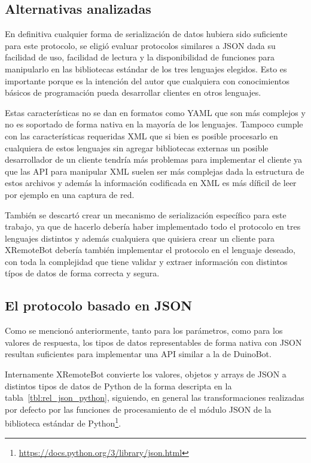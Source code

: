 \subsection{Alternativas analizadas}
En definitiva cualquier forma de serialización de datos hubiera
sido suficiente para este protocolo, se eligió evaluar protocolos
similares a JSON dada su facilidad de uso, facilidad de lectura
y la disponibilidad
de funciones para manipularlo en las bibliotecas estándar
de los tres lenguajes elegidos. Esto es importante porque es
la intención del autor que cualquiera con conocimientos básicos
de programación pueda desarrollar clientes en otros lenguajes.

Estas características no se dan en formatos como YAML que
son más complejos y no es soportado de forma nativa en
la mayoría de los lenguajes. Tampoco cumple con las características
requeridas XML que si bien es posible
procesarlo en cualquiera de estos lenguajes sin agregar bibliotecas
externas un posible desarrollador de un cliente tendría más
problemas para implementar el cliente ya que las API para
manipular XML suelen
ser más complejas dada la estructura de estos archivos y además
la información codificada en XML es más díficil de leer por
ejemplo en una captura de red.

También se descartó crear un mecanismo de serialización específico
para este trabajo, ya que de hacerlo debería haber implementado
todo el protocolo en tres lenguajes distintos y además cualquiera
que quisiera crear un cliente para XRemoteBot debería también
implementar el protocolo en el lenguaje deseado, con toda
la complejidad que tiene validar y extraer información con
distintos típos de datos de forma correcta y segura.

\subsection{El protocolo basado en JSON}

Como se mencionó anteriormente, tanto para los parámetros, como para los valores de respuesta, los tipos
de datos representables de forma nativa con JSON resultan suficientes para
implementar una API similar a la de DuinoBot.

Internamente XRemoteBot
convierte los valores, objetos y arrays de JSON a distintos tipos de
datos de Python de la forma descripta en la
tabla~\ref{tbl:rel_json_python}, siguiendo, en general las transformaciones
realizadas por defecto por las funciones de procesamiento de el módulo
JSON de la biblioteca estándar de
Python\footnote{\url{https://docs.python.org/3/library/json.html}}.

